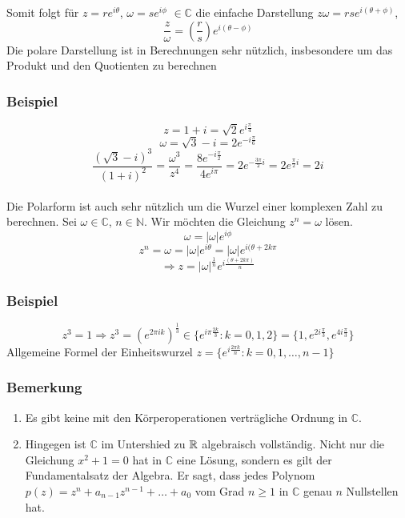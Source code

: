 Somit folgt für $z=re^{i\theta}$, $\omega=se^{i\phi}$ $\in\mathbb{C}$ die einfache Darstellung $z\omega=rse^{i(\theta + \phi)}$, \[\frac{z}{\omega}=\left( \frac{r}{s}\right)e^{i(\theta-\phi)}\]
Die polare Darstellung ist in Berechnungen sehr nützlich, insbesondere um das Produkt und den Quotienten zu berechnen

\subsubsection*{Beispiel}
 \[z=1+i=\sqrt{2}e^{i\frac{\pi}{4}}\]
\[\omega=\sqrt{3}-i=2e^{-i\frac{\pi}{6}}\]
\[\frac{\left(\sqrt{3}-i\right)^3}{(1+i)^2}=\frac{\omega^3}{z^4}=\frac{8e^{-i\frac{\pi}{2}}}{4e^{i\pi}}=2e^{-\frac{3\pi}{2}i}=2e^{\frac{\pi}{2}i}=2i\]\\

Die Polarform ist auch sehr nützlich um die Wurzel einer komplexen Zahl zu berechnen. Sei $\omega\in\mathbb{C}$, $n\in\mathbb{N}$. Wir möchten die Gleichung $z^n=\omega$ lösen.
\[\omega=\left|\omega\right| e^{i\phi}\]
\[z^n=\omega=\left|\omega\right| e^{i\theta}=\left| \omega\right| e^{i(\theta +2k\pi}\]
\[\Rightarrow z=\left| \omega\right|^\frac{1}{n}e^{i\frac{\left(\theta + 2k\pi\right)}{n}}\]

\subsubsection*{Beispiel}
\[z^3=1\Rightarrow z^3=\left( e^{2\pi i k}\right)^\frac{1}{3} \in \{e^{i\pi\frac{2k}{3}}: k=0,1,2\} = \{1,e^{2i\frac{\pi}{3}},e^{4i\frac{\pi}{3}} \}\]
Allgemeine Formel der Einheitswurzel $z=\{ e^{i\frac{2\pi k}{n}}:k=0,1,\dots,n-1\}$\\
\subsubsection*{Bemerkung}
\begin{enumerate}
\item Es gibt keine mit den Körperoperationen verträgliche Ordnung in $\mathbb{C}$.
\item Hingegen ist $\mathbb{C}$ im Untershied zu $\mathbb{R}$ algebraisch vollständig. Nicht nur die Gleichung $x^2+1=0$ hat in $\mathbb{C}$ eine Lösung, sondern es gilt der Fundamentalsatz der Algebra. Er sagt, dass jedes Polynom $p(z)=z^n+a_{n-1}z^{n-1}+\dots+a_0$ vom Grad $n\geq 1$ in $\mathbb{C}$ genau $n$ Nullstellen hat.
\end{enumerate}

